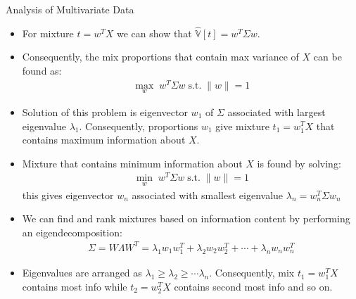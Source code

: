 \documentclass[handout,9pt]{beamer}
\begin{document}
\begin{frame}{Analysis of Multivariate Data}

\begin{itemize}
\setlength{\itemsep}{10pt}
\item For mixture $t=w^TX$ we can show that $\hat{\mathbb{V}}[t]=w^T\Sigma w$. 
\item Consequently, the mix proportions that contain max variance of $X$ can be found as:
\begin{align*}
\max_{w}\; w^T\Sigma w\; \textrm{s.t.}\; \|w\|=1
\end{align*}
\item Solution of this problem is eigenvector $w_1$ of $\Sigma$ associated with largest eigenvalue $\lambda_1$. Consequently, proportions $w_1$ give mixture  $t_1=w_1^TX$ that contains maximum information about $X$. 
\item Mixture that contains minimum information about $X$ is found by solving:
\begin{align*}
\min_{w}\; w^T\Sigma w\; \textrm{s.t.}\; \|w\|=1
\end{align*}
this gives eigenvector $w_n$ associated with smallest eigenvalue $\lambda_n=w^T_n\Sigma w_n$

\item We can find and rank mixtures based on information content by performing an eigendecomposition: 
\begin{align*}
\Sigma = W\Lambda W^T=\lambda_1w_1w_1^T+\lambda_2w_2w_2^T+\cdots + \lambda_n w_nw_n^T
\end{align*}
\item Eigenvalues are arranged as $\lambda_1\geq \lambda_2\geq \cdots \lambda _n$. Consequently, mix $t_1=w_1^TX$ contains most info while $t_2=w_2^TX$ contains second most info and so on. 


\end{itemize}


\end{frame}

\end{document}
